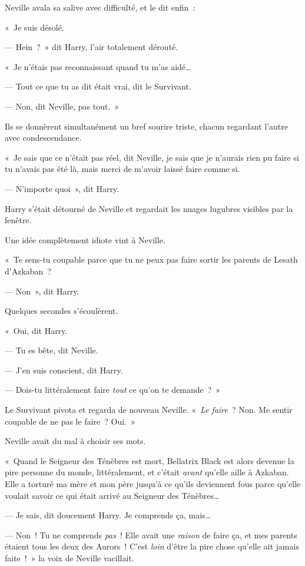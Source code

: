 Neville avala sa salive avec difficulté, et le dit enfin~:

«~Je suis désolé.

--- Hein~?~» dit Harry, l'air totalement dérouté.

«~Je n'étais pas reconnaissant quand tu m'as aidé…

--- Tout ce que tu as dit était vrai, dit le Survivant.

--- Non, dit Neville, pas tout.~»

Ils se donnèrent simultanément un bref sourire triste, chacun regardant l'autre avec condescendance.

«~Je sais que ce n'était pas réel, dit Neville, je sais que je n'aurais rien pu faire si tu n'avais pas été là, mais merci de m'avoir laissé faire comme si.

--- N'importe quoi~», dit Harry.

Harry s'était détourné de Neville et regardait les nuages lugubres visibles par la fenêtre.

Une idée complètement idiote vint à Neville.

«~Te sens-tu coupable parce que tu ne peux pas faire sortir les parents de Lesath d'Azkaban~?

--- Non~», dit Harry.

Quelques secondes s'écoulèrent.

«~Oui, dit Harry.

--- Tu es bête, dit Neville.

--- J'en suis conscient, dit Harry.

--- Dois-tu littéralement faire \emph{tout} ce qu'on te demande~?~»

Le Survivant pivota et regarda de nouveau Neville. «~\emph{Le faire}~? Non. Me sentir coupable de ne pas le faire~? Oui.~»

Neville avait du mal à choisir ses mots.

«~Quand le Seigneur des Ténèbres est mort, Bellatrix Black est alors devenue la pire personne du monde, littéralement, et c'était \emph{avant} qu'elle aille à Azkaban. Elle a torturé ma mère et mon père jusqu'à ce qu'ils deviennent fous parce qu'elle voulait savoir ce qui était arrivé au Seigneur des Ténèbres…

--- Je sais, dit doucement Harry. Je comprends ça, mais…

--- Non~! Tu ne comprends \emph{pas}~! Elle avait une \emph{raison} de faire ça, et mes parents étaient tous les deux des Aurors~! C'est \emph{loin} d'être la pire chose qu'elle ait jamais faite~!~» la voix de Neville vacillait.

